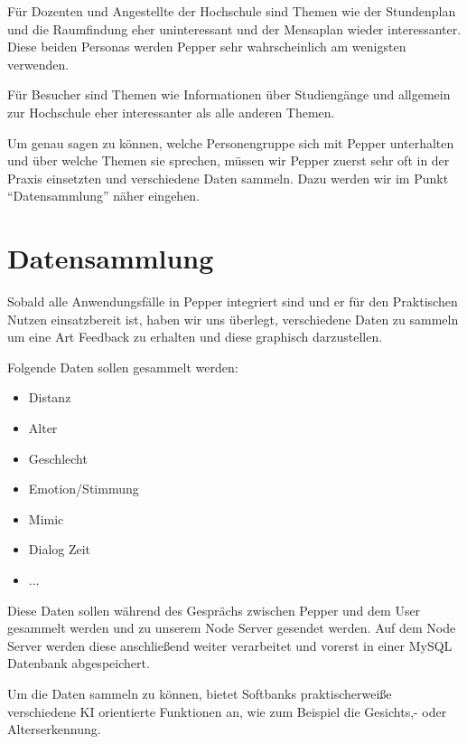 Für Dozenten und Angestellte der Hochschule sind Themen wie der Stundenplan und die Raumfindung eher uninteressant und der Mensaplan wieder interessanter. Diese beiden Personas werden Pepper sehr wahrscheinlich am wenigsten verwenden.

Für Besucher sind Themen wie Informationen über Studiengänge und allgemein zur Hochschule eher interessanter als alle anderen Themen.

Um genau sagen zu können, welche Personengruppe sich mit Pepper unterhalten und über welche Themen sie sprechen, müssen wir Pepper zuerst sehr oft in der Praxis einsetzten und verschiedene Daten sammeln. Dazu werden wir im Punkt “Datensammlung” näher eingehen.\\


\section{Datensammlung}
Sobald alle Anwendungsfälle in Pepper integriert sind und er für den Praktischen Nutzen einsatzbereit ist, haben wir uns überlegt, verschiedene Daten zu sammeln um eine Art Feedback zu erhalten und diese graphisch darzustellen.

Folgende Daten sollen gesammelt werden:
\begin{itemize}
    \item Distanz
    \item Alter
    \item Geschlecht
    \item Emotion/Stimmung
    \item Mimic
    \item Dialog Zeit
    \item ...
\end{itemize}

Diese Daten sollen während des Gesprächs zwischen Pepper und dem User gesammelt werden und zu unserem Node Server gesendet werden.
Auf dem Node Server werden diese anschließend weiter verarbeitet und vorerst in einer MySQL Datenbank abgespeichert.

Um die Daten sammeln zu können, bietet Softbanks praktischerweiße verschiedene KI orientierte Funktionen an, wie zum Beispiel die Gesichts,- oder Alterserkennung.

